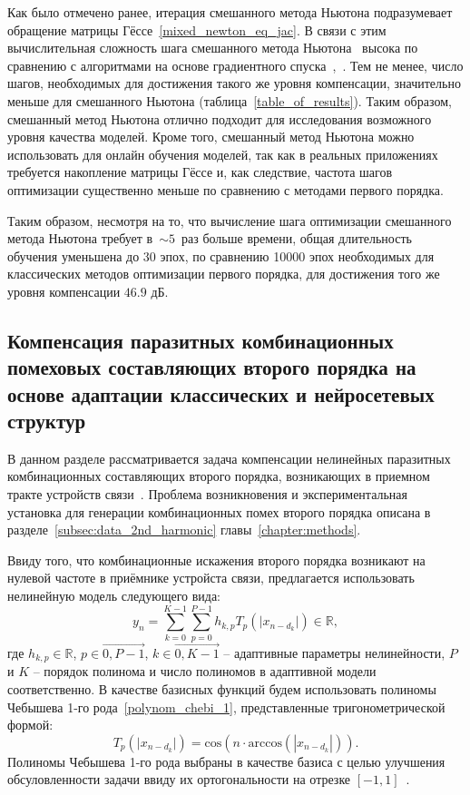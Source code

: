 Как было отмечено ранее, итерация смешанного метода Ньютона подразумевает обращение матрицы Гёссе~\eqref{mixed_newton_eq_jac}. В связи с этим вычислительная сложность шага смешанного метода Ньютона~\cite{mixed_newton_global_opt} высока по сравнению с алгоритмами на основе градиентного спуска~\cite{polyak1964some},~\cite{kingma2014adam}. Тем не менее, число шагов, необходимых для достижения такого же уровня компенсации, значительно меньше для смешанного Ньютона (таблица~\ref{table_of_results}). Таким образом, смешанный метод Ньютона отлично подходит для исследования возможного уровня качества моделей. Кроме того, смешанный метод Ньютона можно использовать для онлайн обучения моделей, так как в реальных приложениях требуется накопление матрицы Гёссе и, как следствие, частота шагов оптимизации существенно меньше по сравнению с методами первого порядка.

Таким образом, несмотря на то, что вычисление шага оптимизации смешанного метода Ньютона требует в~$\sim5$~раз больше времени, общая длительность обучения уменьшена до 30 эпох, по сравнению 10000 эпох необходимых для классических методов оптимизации первого порядка, для достижения того же уровня компенсации $46.9$ дБ.

\subsection{Компенсация паразитных комбинационных помеховых составляющих второго порядка на основе адаптации классических и нейросетевых структур}
\label{subsec:2nd_harmonic}

В данном разделе рассматривается задача компенсации нелинейных паразитных комбинационных составляющих второго порядка, возникающих в приемном тракте устройств связи~\cite{sic_imd2_phd}. Проблема возникновения и экспериментальная установка для генерации комбинационных помех второго порядка описана в разделе~\ref{subsec:data_2nd_harmonic} главы~\ref{chapter:methods}.

Ввиду того, что комбинационные искажения второго порядка возникают на нулевой частоте в приёмнике устройста связи, предлагается использовать нелинейную модель следующего вида:
\begin{equation}
	y_n = \sum_{k=0}^{K-1}\sum_{p=0}^{P-1}h_{k,p} T_{p}(\lvert x_{n-d_k}\rvert)\in\mathbb{R}, 
	\label{cheby_1}
\end{equation}
где $h_{k,p}\in\mathbb{R}$, $p\in\overrightarrow{0, P-1}$, $k\in\overrightarrow{0, K-1}$ -- адаптивные параметры нелинейности, $P$ и $K$ -- порядок полинома и число полиномов в адаптивной модели соответственно. В качестве базисных функций будем использовать полиномы Чебышева 1-го рода~\eqref{polynom_chebi_1}, представленные тригонометрической формой:
\begin{equation}
	T_{p}(\lvert x_{n-d_k}\rvert)=\text{cos}(n\cdot \text{arccos}(|x_{n-d_k}|)).
	\label{cheby_1_kind_trig_basis}
\end{equation}
Полиномы Чебышева 1-го рода выбраны в качестве базиса с целью улучшения обсуловленности задачи ввиду их ортогональности на отрезке $[-1, 1]$~\cite{spec_func}.

